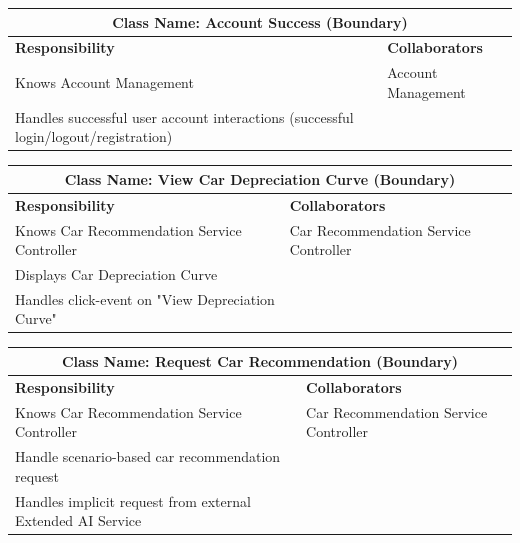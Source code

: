 \documentclass[]{article}
\begin{document}
\begin{table}[H]
  \centering
  \renewcommand{\arraystretch}{1.3} %
  \begin{tabular}{|p{7.5cm}|p{7.5cm}|}
    \hline
    \multicolumn{2}{|c|}{\textbf{Class Name: Account Success (Boundary)}}                                        \\
    \hline
    \textbf{Responsibility}                                                             & \textbf{Collaborators} \\
    \hline
    Knows Account Management                                                            & Account Management     \\
    Handles successful user account interactions (successful login/logout/registration) &                        \\
    \hline
  \end{tabular}
\end{table}
\begin{table}[H]
  \centering
  \renewcommand{\arraystretch}{1.3} %
  \begin{tabular}{|p{7.5cm}|p{7.5cm}|}
    \hline
    \multicolumn{2}{|c|}{\textbf{Class Name: View Car Depreciation Curve (Boundary)}}        \\
    \hline
    \textbf{Responsibility}                          & \textbf{Collaborators}                \\
    \hline
    Knows Car Recommendation Service Controller      & Car Recommendation Service Controller \\
    Displays Car Depreciation Curve                  &                                       \\
    Handles click-event on "View Depreciation Curve" &                                       \\
    \hline
  \end{tabular}
  \label{tab:crc_card}
\end{table}
\begin{table}[H]
  \centering
  \renewcommand{\arraystretch}{1.3} %
  \begin{tabular}{|p{7.5cm}|p{7.5cm}|}
    \hline
    \multicolumn{2}{|c|}{\textbf{Class Name: Request Car Recommendation (Boundary)}}                   \\
    \hline
    \textbf{Responsibility}                                    & \textbf{Collaborators}                \\
    \hline
    Knows Car Recommendation Service Controller                & Car Recommendation Service Controller \\
    Handle scenario-based car recommendation request           &                                       \\
    Handles implicit request from external Extended AI Service &                                       \\
    \hline
  \end{tabular}
  \label{tab:crc_card}
\end{table}
\end{document}

